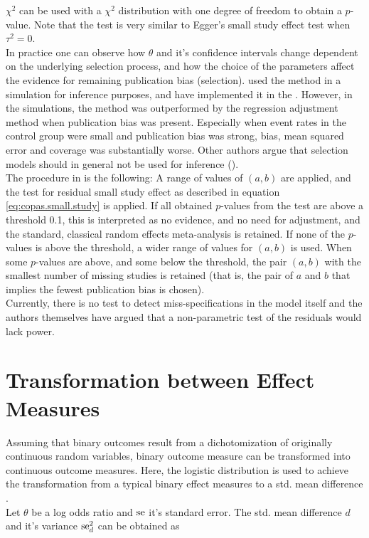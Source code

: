 \documentclass[11pt,a4paper,twoside]{book}\usepackage[]{graphicx}\usepackage[]{color}
\begin{document}
$\chi^2$ can be used with a $\chi^2$ distribution with one degree of freedom to obtain a $p$\hspace{0.4mm}-value. Note that the test is very similar to Egger's small study effect test when $\tau^2 = 0$.\\
In practice one can observe how $\theta$ and it's confidence intervals change dependent on the underlying selection process, and how the choice of the parameters affect the evidence for remaining publication bias (selection). \citet{limitmeta} used the method in a simulation for inference purposes, and have implemented it in the \citet{meta.package}. However, in the simulations, the method was outperformed by the regression adjustment method when publication bias was present. Especially when event rates in the control group were small and publication bias was strong, bias, mean squared error and coverage was substantially worse. Other authors argue that selection models should in general not be used for inference (\eg \citealp{selection.assessment}).\\
The procedure in \citet{limitmeta} is the following: A range of values of $(a,b)$ are applied, and the test for residual small study effect as described in equation \eqref{eq:copas.small.study} is applied. If all obtained  $p$\hspace{0.4mm}-values from the test are above a threshold 0.1, this is interpreted as no evidence, and no need for adjustment, and the standard, classical random effects meta-analysis is retained. If none of the  $p$\hspace{0.4mm}-values is above the threshold, a wider range of values for $(a,b)$ is used. When some  $p$\hspace{0.4mm}-values are above, and some below the threshold, the pair $(a,b)$ with the smallest number of missing studies is retained (that is, the pair of $a$ and $b$ that implies the fewest publication bias is chosen).\\
Currently, there is no test to detect miss-specifications in the model itself and the authors themselves have argued that a non-parametric test of the residuals would lack power.



\section{Transformation between Effect Measures} \label{sec:transformation.effectsizes}
Assuming that binary outcomes result from a dichotomization of originally continuous random variables, binary outcome measure can be transformed into continuous outcome measures. Here, the logistic distribution is used to achieve the transformation from a typical binary effect measures to a std. mean difference \cite[47]{Intro.meta}.\\
Let $\theta$ be a log odds ratio and $\operatorname{se}$ it's standard error. The std. mean difference $d$ and it's variance $\operatorname{se}_d^2$ can be obtained as
\end{document}
